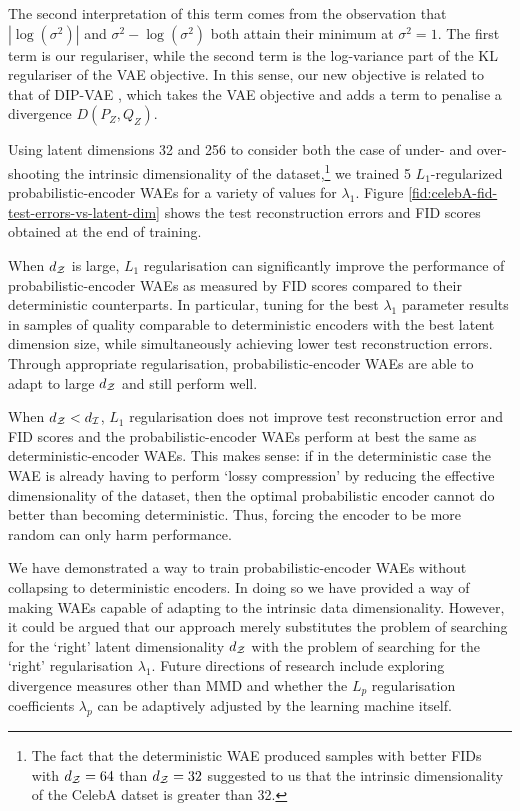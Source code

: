 The second interpretation of this term comes from the observation that $|\log\left(\sigma^2 \right)|$ and $\sigma^2  - \log\left(\sigma^2\right)$ both attain their minimum at $\sigma^2=1$. The first term is our regulariser, while the second term is the log-variance part of the KL regulariser of the VAE objective. In this sense, our new objective is related to that of DIP-VAE \citep{kumar2017variational}, which takes the VAE objective and adds a term to penalise a divergence $D(P_Z, Q_Z)$.

Using latent dimensions 32 and 256 to consider both the case of under- and over-shooting the intrinsic dimensionality of the dataset,\footnote{The fact that the deterministic WAE produced samples with better FIDs with $d_{\mathcal{Z}}=64$ than $d_{\mathcal{Z}}=32$ suggested to us that the intrinsic dimensionality of the CelebA datset is greater than 32.} we trained 5 $L_1$-regularized probabilistic-encoder WAEs for a variety of values for $\lambda_1$. Figure \ref{fid:celebA-fid-test-errors-vs-latent-dim} shows the test reconstruction errors and FID scores obtained at the end of training.

When $d_{\mathcal{Z}}$ is large, $L_1$ regularisation can significantly improve the performance of probabilistic-encoder WAEs as measured by FID scores compared to their deterministic counterparts. In particular, tuning for the best $\lambda_1$ parameter results in samples of quality comparable to deterministic encoders with the best latent dimension size, while simultaneously achieving lower test reconstruction errors.
Through appropriate regularisation, probabilistic-encoder WAEs are able to adapt to large $d_{\mathcal{Z}}$ and still perform well.

When $d_{\mathcal{Z}} < d_\mathcal{I}$,  $L_1$ regularisation does not improve test reconstruction error and FID scores and the probabilistic-encoder WAEs perform at best the same as deterministic-encoder WAEs. This makes sense: if in the deterministic case the WAE is already having to perform `lossy compression' by reducing the effective dimensionality of the dataset, then the optimal probabilistic encoder cannot do better than becoming deterministic. Thus, forcing the encoder to be more random can only harm performance.


We have demonstrated a way to train probabilistic-encoder WAEs without collapsing to deterministic encoders.
In doing so we have provided a way of making WAEs capable of adapting to the intrinsic data dimensionality.
 However, it could be argued that our approach merely substitutes the problem of searching for the `right' latent dimensionality $d_{\mathcal{Z}}$ with the problem of searching for the `right' regularisation $\lambda_1$. 
Future directions of research include exploring divergence measures other than MMD and whether the $L_p$ regularisation coefficients $\lambda_p$ can be adaptively adjusted by the learning machine itself.

